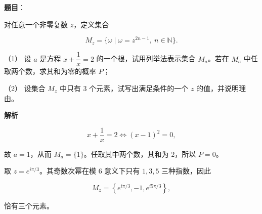 \begin{answer}

\textbf{题目}：

对任意一个非零复数 $z$，定义集合

\nopagebreak[4]
\[
M_z=\{\omega\mid \omega=z^{2n-1},\ n\in\mathbb N\}.
\]

（1） 设 $a$ 是方程 $x+\dfrac1x=2$ 的一个根，试用列举法表示集合 $M_a$。若在 $M_a$ 中任取两个数，求其和为零的概率 $P$；

（2） 设集合 $M_z$ 中只有 3 个元素，试写出满足条件的一个 $z$ 的值，并说明理由。

\textbf{解析}


\nopagebreak[4]
\[
x+\frac1x=2
\Longleftrightarrow (x-1)^2=0,
\]

故 $a=1$，从而 $M_a=\{1\}$。任取其中两个数，其和为 $2$，所以 $P=0$。


取 $z=e^{i\pi/3}$。其奇数次幂在模 $6$ 意义下只有 $1,3,5$ 三种指数，因此

\nopagebreak[4]
\[
M_z=\left\{e^{i\pi/3},-1,e^{i5\pi/3}\right\},
\]

恰有三个元素。



\end{answer}

